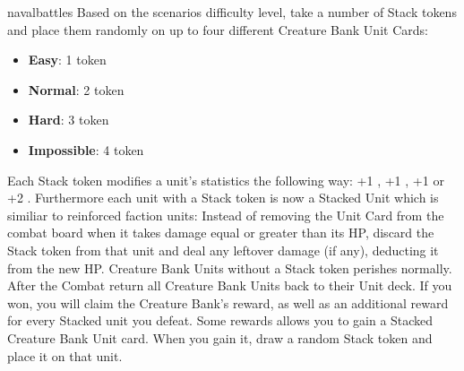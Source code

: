 \begin{multicols*}{2}
\begin{expansion}{navalbattles}
	Based on the scenarios difficulty level, take a number of Stack tokens and place them randomly on up to four different Creature Bank Unit Cards:
	\begin{itemize}
		\item \textbf{Easy}: 1 token
		\item \textbf{Normal}: 2 token
		\item \textbf{Hard}: 3 token
		\item \textbf{Impossible}: 4 token
	\end{itemize}
	
	Each Stack token modifies a unit's statistics the following way: +1 , +1 , +1  or +2 . Furthermore each unit with a Stack token is now a Stacked Unit which is similiar to reinforced faction units: Instead of removing the Unit Card from the combat board when it takes damage equal or greater than its HP, discard the Stack token from that unit and deal any leftover damage (if any), deducting it from the new HP. Creature Bank Units without a Stack token perishes normally. After the Combat return all Creature Bank Units back to their Unit deck. If you won, you will claim the Creature Bank's reward, as well as an additional reward for every Stacked unit you defeat. Some rewards allows you to gain a Stacked Creature Bank Unit card. When you gain it, draw a random Stack token and place it on that unit.  
\end{expansion}
	
\end{multicols*}
